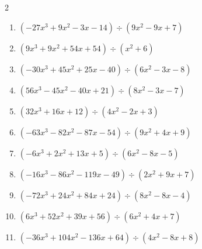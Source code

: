 \begin{multicols}{2}
\begin{enumerate}
\columnbreak %

  \item $(-27x^{3}+9x^{2}-3x-14) \div (9x^{2}-9x+7)$

        \phantom{$商 : -3x-2, \quad 剰余 : 6$}

  \item $(9x^{3}+9x^{2}+54x+54) \div (x^{2}+6)$

        \phantom{$商 : 9x+9, \quad 剰余 : -7x+4$}

  \item $(-30x^{3}+45x^{2}+25x-40) \div (6x^{2}-3x-8)$

        \phantom{$商 : -5x+5, \quad 剰余 : 4x-6$}

  \item $(56x^{3}-45x^{2}-40x+21) \div (8x^{2}-3x-7)$

        \phantom{$商 : 7x-3, \quad 剰余 : 5x+2$}

  \item $(32x^{3}+16x+12) \div (4x^{2}-2x+3)$

        \phantom{$商 : 8x+4, \quad 剰余 : -2x+9$}

\columnbreak %

\resetques

  \item $(-63x^{3}-82x^{2}-87x-54) \div (9x^{2}+4x+9)$

        \phantom{$商 : -7x-6, \quad 剰余 : -6x-3$}

  \item $(-6x^{3}+2x^{2}+13x+5) \div (6x^{2}-8x-5)$

        \phantom{$商 : -x-1, \quad 剰余 : -5x+4$}

  \item $(-16x^{3}-86x^{2}-119x-49) \div (2x^{2}+9x+7)$

        \phantom{$商 : -8x-7, \quad 剰余 : -7x+6$}

  \item $(-72x^{3}+24x^{2}+84x+24) \div (8x^{2}-8x-4)$

        \phantom{$商 : -9x-6, \quad 剰余 : 7x-8$}

  \item $(6x^{3}+52x^{2}+39x+56) \div (6x^{2}+4x+7)$

        \phantom{$商 : x+8, \quad 剰余 : -4x-9$}

\columnbreak %

  \item $(-36x^{3}+104x^{2}-136x+64) \div (4x^{2}-8x+8)$


\end{enumerate}
\end{multicols}
